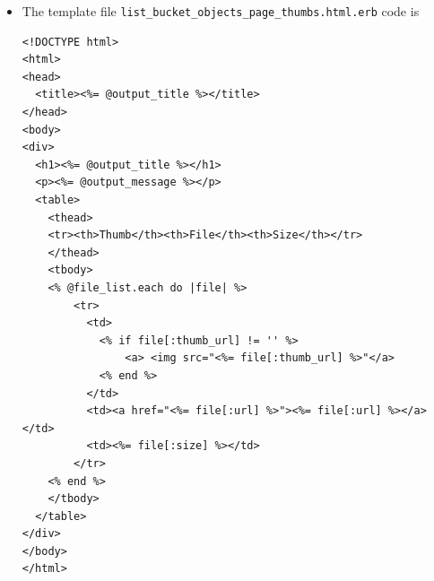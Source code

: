 \documentclass{beamer}
\begin{document}
\begin{frame}
\begin{itemize}
\begin{lstlisting}[escapechar=!]
require File.expand_path(File.dirname(__FILE__) + '/../config')
require File.expand_path(File.dirname(__FILE__) + '/book.inc.rb')

def get_file_list( s3, cloud_front, bucket_name, thumb_bucket_name )
  distribution = find_distribution_for_bucket cloud_front, bucket_name
  url = distribution ?  "https://#{distribution[:domain_name]}" : "#{S3_AMAZONAWS_URL}/#{bucket_name}"

  thumb_distribution = find_distribution_for_bucket cloud_front, thumb_bucket_name
  thumb_url = if thumb_distribution then
                 "https://#{thumb_distribution[:domain_name]}"
               else
                 "#{S3_AMAZONAWS_URL}/#{thumb_bucket_name}"
               end
  
  # access to objects in the buckets
  objects = get_bucket_objects s3, bucket_name
  thumb_objects = get_bucket_objects s3, thumb_bucket_name

  file_list = []
  objects.each do |object|
    key = object[:key]
    thumb_uri = thumb_objects.detect{|thumb_object| thumb_object[:key] == key}?  "#{thumb_url}/#{key}": ''

    file_list << { key: key, size: object[:size], url: "#{url}/#{key}", thumb_url: thumb_uri}
    return file_list if file_list.size > 10
  end unless objects.nil ?
  file_list
end

if __FILE__ == $0
  unless ARGV.size == 2
    puts "Usage: #{__FILE__} <BUCKET_NAME|-> <THUMB_BUCKET_NAME|->"
    exit 1
  end

  (bucket_name, thumb_bucket_name) = ARGV
  bucket_name = BOOK_BUCKET if bucket_name == '-'
  thumb_bucket_name = "#{BOOK_BUCKET}#{THUMB_BUCKET_SUFFIX}" if thumb_bucket_name == '-'

  # get an instance of the S3 interface using the default configuration
  s3 = AWS::S3.new

  # get an instance of the CloudFront interface using the default configuration
  cloud_front = AWS::CloudFront.new

  puts get_file_list( s3, cloud_front, bucket_name, thumb_bucket_name ).to_s
end
\end{lstlisting}

\item The template file \texttt{list\_bucket\_objects\_page\_thumbs.html.erb} code is
\lstset{language=Ruby, style=eclipse}
\begin{lstlisting}
<!DOCTYPE html>
<html>
<head>
  <title><%= @output_title %></title>
</head>
<body>
<div>
  <h1><%= @output_title %></h1>
  <p><%= @output_message %></p>
  <table>
    <thead>
    <tr><th>Thumb</th><th>File</th><th>Size</th></tr>
    </thead>
    <tbody>
    <% @file_list.each do |file| %>
        <tr>
          <td>
            <% if file[:thumb_url] != '' %>
                <a> <img src="<%= file[:thumb_url] %>"</a>
            <% end %>
          </td>
          <td><a href="<%= file[:url] %>"><%= file[:url] %></a></td>
          <td><%= file[:size] %></td>
        </tr>
    <% end %>
    </tbody>
  </table>
</div>
</body>
</html>
\end{lstlisting}


\end{itemize}
\end{frame}
\end{document}
